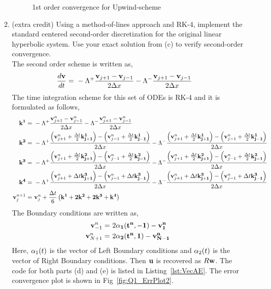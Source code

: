 \documentclass[11pt]{article}
\newcommand{\bu}{{\bf u}}
\newcommand{\bv}{{\bf v}}
\newcommand{\bw}{{\bf w}}
\newcommand{\dx}{{\Delta x}}
\newcommand{\dt}{{\Delta t}}
\newcommand{\bra}[1]{\left(#1\right)}
\begin{document}
\begin{enumerate}
\begin{enumerate}
\begin{figure}[htp]
        \caption{1st order convergence for Upwind-scheme}
        \label{fig:Q1_ErrPlot}
    \end{figure}
    \item {\color{blue}(extra credit) Using a method-of-lines approach and RK-4, implement the standard centered second-order discretization for the original linear hyperbolic system. Use your exact solution from (c) to verify second-order convergence.} \\
    The second order scheme is written as, 
    \begin{align*}
        \frac{d\bv}{dt} =& \ -\Lambda^{+}\frac{\bv_{j+1}-\bv_{j-1}}{2\dx}-\Lambda^{-}\frac{\bv_{j+1}-\bv_{j-1}}{2\dx}
    \end{align*}
    The time integration scheme for this set of ODEs is RK-4 and it is formulated as follows, 
    \begin{align*}
        \bf{k}^1 =& \ -\Lambda^{+}\frac{\bv_{j+1}^n-\bv_{j-1}^n}{2\dx}-\Lambda^{-}\frac{\bv_{j+1}^n-\bv_{j-1}^n}{2\dx} \\
        \bf{k}^2 =& \ -\Lambda^{+}\frac{\bra{\bv_{j+1}^n+\frac{\dt}{2}\bf{k}^1_{j+1}}-\bra{\bv_{j-1}^n+\frac{\dt}{2}\bf{k}^1_{j-1}}}{2\dx}-\Lambda^{-}\frac{\bra{\bv_{j+1}^n+\frac{\dt}{2}\bf{k}^1_{j+1}}-\bra{\bv_{j-1}^n+\frac{\dt}{2}\bf{k}^1_{j-1}}}{2\dx} \\ 
        \bf{k}^3 =& \ -\Lambda^{+}\frac{\bra{\bv_{j+1}^n+\frac{\dt}{2}\bf{k}^2_{j+1}}-\bra{\bv_{j-1}^n+\frac{\dt}{2}\bf{k}^2_{j-1}}}{2\dx}-\Lambda^{-}\frac{\bra{\bv_{j+1}^n+\frac{\dt}{2}\bf{k}^2_{j+1}}-\bra{\bv_{j-1}^n+\frac{\dt}{2}\bf{k}^2_{j-1}}}{2\dx} \\ 
        \bf{k}^4 =& \ -\Lambda^{+}\frac{\bra{\bv_{j+1}^n+\dt\bf{k}^3_{j+1}}-\bra{\bv_{j-1}^n+\dt\bf{k}^3_{j-1}}}{2\dx}-\Lambda^{-}\frac{\bra{\bv_{j+1}^n+\dt\bf{k}^3_{j+1}}-\bra{\bv_{j-1}^n+\dt\bf{k}^3_{j-1}}}{2\dx} \\ 
        \bv^{n+1}_{j} =& \ \bv^n_j + \frac{\dt}{6}\bra{\bf{k^1} + \bf{2k^2} + \bf{2k^3} + \bf{k^4}} 
    \end{align*}
    The Boundary conditions are written as,
    \begin{align*}
        \bv^n_{-1} =& \ 2\bf{\alpha}_1(t^n,-1) - \bv^n_{1} \\
        \bv^n_{N+1} =& \ 2\bf{\alpha}_2(t^n,1) - \bv^n_{N-1}
    \end{align*}
    Here, ${\bf \alpha}_1(t)$ is the vector of Left Boundary conditions and ${\bf \alpha}_2(t)$ is the vector of Right Boundary conditions. Then $\bu$ is recovered as $R\bw$. The code for both parts (d) and (e) is listed in Listing~\ref{lst:VecAE}. The error convergence plot is shown in Fig~\ref{fig:Q1_ErrPlot2}. \\

\end{enumerate}
\end{enumerate}
\end{document}
